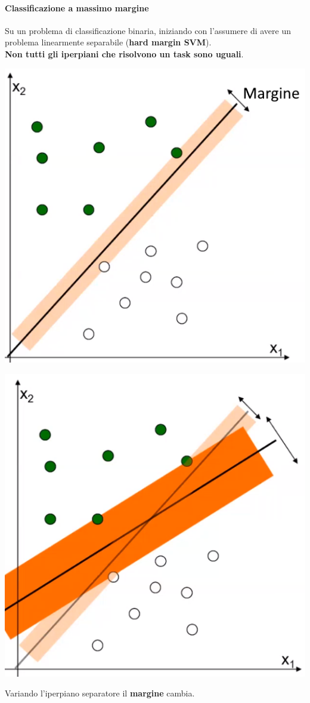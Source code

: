 \documentclass[10pt]{book}
\begin{document}
\paragraph{Classificazione a massimo margine} Su un problema di classificazione binaria, iniziando con l'assumere di avere un problema linearmente separabile (\textbf{hard margin SVM}).\\
\textbf{Non tutti gli iperpiani che risolvono un task sono uguali}.
\begin{multicols}{2}
\begin{center}
	\includegraphics[scale=0.55]{mlmargin.png}
\end{center}\begin{center}
	\includegraphics[scale=0.55]{mlmargin2.png}
\end{center}
\end{multicols}
Variando l'iperpiano separatore il \textbf{margine} cambia.
\end{document}
